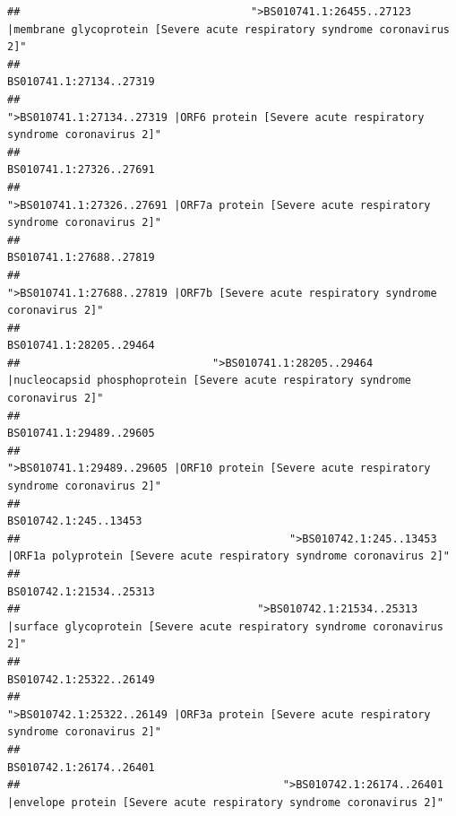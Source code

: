 \documentclass[
]{article}
\begin{document}
\begin{verbatim}
##                                    ">BS010741.1:26455..27123 |membrane glycoprotein [Severe acute respiratory syndrome coronavirus 2]" 
##                                                                                                                BS010741.1:27134..27319 
##                                             ">BS010741.1:27134..27319 |ORF6 protein [Severe acute respiratory syndrome coronavirus 2]" 
##                                                                                                                BS010741.1:27326..27691 
##                                            ">BS010741.1:27326..27691 |ORF7a protein [Severe acute respiratory syndrome coronavirus 2]" 
##                                                                                                                BS010741.1:27688..27819 
##                                                    ">BS010741.1:27688..27819 |ORF7b [Severe acute respiratory syndrome coronavirus 2]" 
##                                                                                                                BS010741.1:28205..29464 
##                              ">BS010741.1:28205..29464 |nucleocapsid phosphoprotein [Severe acute respiratory syndrome coronavirus 2]" 
##                                                                                                                BS010741.1:29489..29605 
##                                            ">BS010741.1:29489..29605 |ORF10 protein [Severe acute respiratory syndrome coronavirus 2]" 
##                                                                                                                  BS010742.1:245..13453 
##                                          ">BS010742.1:245..13453 |ORF1a polyprotein [Severe acute respiratory syndrome coronavirus 2]" 
##                                                                                                                BS010742.1:21534..25313 
##                                     ">BS010742.1:21534..25313 |surface glycoprotein [Severe acute respiratory syndrome coronavirus 2]" 
##                                                                                                                BS010742.1:25322..26149 
##                                            ">BS010742.1:25322..26149 |ORF3a protein [Severe acute respiratory syndrome coronavirus 2]" 
##                                                                                                                BS010742.1:26174..26401 
##                                         ">BS010742.1:26174..26401 |envelope protein [Severe acute respiratory syndrome coronavirus 2]" 

\end{verbatim}
\end{document}
